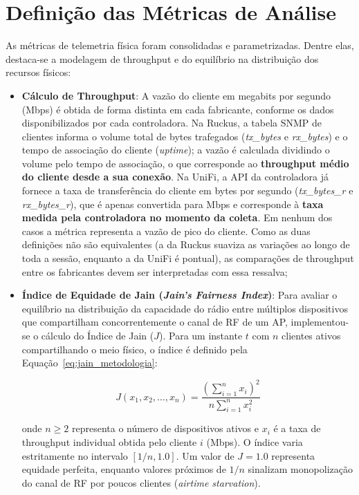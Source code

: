 \section{Definição das Métricas de Análise}
\label{sec:metodologia_metricas}

As métricas de telemetria física foram consolidadas e parametrizadas. Dentre elas, destaca-se a modelagem de throughput e do equilíbrio na distribuição dos recursos físicos:
\begin{itemize}
	\item \textbf{Cálculo de Throughput}: A vazão do cliente em megabits por segundo (Mbps) é obtida de forma distinta em cada fabricante, conforme os dados disponibilizados por cada controladora. Na Ruckus, a tabela SNMP de clientes informa o volume total de bytes trafegados (\textit{tx\_bytes} e \textit{rx\_bytes}) e o tempo de associação do cliente (\textit{uptime}); a vazão é calculada dividindo o volume pelo tempo de associação, o que corresponde ao \textbf{throughput médio do cliente desde a sua conexão}. Na UniFi, a API da controladora já fornece a taxa de transferência do cliente em bytes por segundo (\textit{tx\_bytes\_r} e \textit{rx\_bytes\_r}), que é apenas convertida para Mbps e corresponde à \textbf{taxa medida pela controladora no momento da coleta}. Em nenhum dos casos a métrica representa a vazão de pico do cliente. Como as duas definições não são equivalentes (a da Ruckus suaviza as variações ao longo de toda a sessão, enquanto a da UniFi é pontual), as comparações de throughput entre os fabricantes devem ser interpretadas com essa ressalva;
	\item \textbf{Índice de Equidade de Jain (\textit{Jain's Fairness Index})}: Para avaliar o equilíbrio na distribuição da capacidade do rádio entre múltiplos dispositivos que compartilham concorrentemente o canal de RF de um AP, implementou-se o cálculo do Índice de Jain ($J$). Para um instante $t$ com $n$ clientes ativos compartilhando o meio físico, o índice é definido pela Equação~\ref{eq:jain_metodologia}:

	\begin{equation}
	\label{eq:jain_metodologia}
	J(x_1, x_2, \dots, x_n) = \frac{\left( \sum_{i=1}^{n} x_i \right)^2}{n \sum_{i=1}^{n} x_i^2}
	\end{equation}

	onde $n \ge 2$ representa o número de dispositivos ativos e $x_i$ é a taxa de throughput individual obtida pelo cliente $i$ (Mbps). O índice varia estritamente no intervalo $[1/n, 1.0]$. Um valor de $J = 1.0$ representa equidade perfeita, enquanto valores próximos de $1/n$ sinalizam monopolização do canal de RF por poucos clientes (\textit{airtime starvation}).
\end{itemize}

